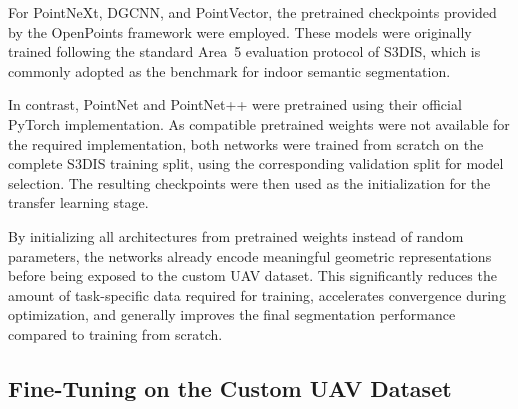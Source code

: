 For PointNeXt, DGCNN, and PointVector, the pretrained checkpoints provided by the OpenPoints framework were employed. These models were originally trained following the standard Area~5 evaluation protocol of S3DIS, which is commonly adopted as the benchmark for indoor semantic segmentation.

In contrast, PointNet and PointNet++ were pretrained using their official PyTorch implementation. As compatible pretrained weights were not available for the required implementation, both networks were trained from scratch on the complete S3DIS training split, using the corresponding validation split for model selection. The resulting checkpoints were then used as the initialization for the transfer learning stage.

By initializing all architectures from pretrained weights instead of random parameters, the networks already encode meaningful geometric representations before being exposed to the custom UAV dataset. This significantly reduces the amount of task-specific data required for training, accelerates convergence during optimization, and generally improves the final segmentation performance compared to training from scratch.

\subsection{Fine-Tuning on the Custom UAV Dataset}
\label{subsec:fine_tuning}

